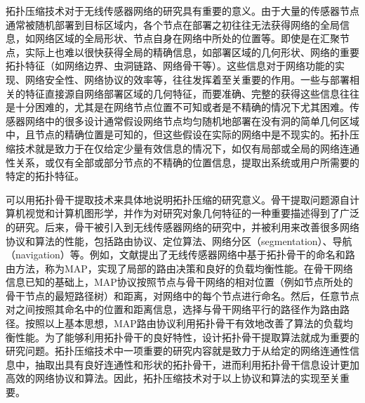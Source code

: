 拓扑压缩技术对于无线传感器网络的研究具有重要的意义。由于大量的传感器节点通常被随机部署到目标区域内，各个节点在部署之初往往无法获得网络的全局信息，如网络区域的全局形状、节点自身在网络中所处的位置等。即使是在汇聚节点，实际上也难以很快获得全局的精确信息，如部署区域的几何形状、网络的重要拓扑特征（如网络边界、虫洞链路、网络骨干等）。这些信息对于网络功能的实现、网络安全性、网络协议的效率等，往往发挥着至关重要的作用。一些与部署相关的特征直接源自网络部署区域的几何特征，而要准确、完整的获得这些信息往往是十分困难的，尤其是在网络节点位置不可知或者是不精确的情况下尤其困难。传感器网络中的很多设计通常假设网络节点均匀随机地部署在没有洞的简单几何区域中，且节点的精确位置是可知的，但这些假设在实际的网络中是不现实的。拓扑压缩技术就是致力于在仅给定少量有效信息的情况下，如仅有局部或全局的网络连通性关系，或仅有全部或部分节点的不精确的位置信息，提取出系统或用户所需要的特定的拓扑特征。

可以用拓扑骨干提取技术来具体地说明拓扑压缩的研究意义。骨干提取问题源自计算机视觉和计算机图形学，并作为对研究对象几何特征的一种重要描述得到了广泛的研究。后来，骨干被引入到无线传感器网络的研究中，并被利用来改善很多网络协议和算法的性能，包括路由协议、定位算法、网络分区（segmentation）、导航（navigation）等。例如，文献提出了无线传感器网络中基于拓扑骨干的命名和路由方法，称为MAP，实现了局部的路由决策和良好的负载均衡性能。在骨干网络信息已知的基础上，MAP协议按照节点与骨干网络的相对位置（例如节点所处的骨干节点的最短路径树）和距离，对网络中的每个节点进行命名。然后，任意节点对之间按照其命名中的位置和距离信息，选择与骨干网络平行的路径作为路由路径。按照以上基本思想，MAP路由协议利用拓扑骨干有效地改善了算法的负载均衡性能。为了能够利用拓扑骨干的良好特性，设计拓扑骨干提取算法就成为重要的研究问题。拓扑压缩技术中一项重要的研究内容就是致力于从给定的网络连通性信息中，抽取出具有良好连通性和形状的拓扑骨干，进而利用拓扑骨干信息设计更加高效的网络协议和算法。因此，拓扑压缩技术对于以上协议和算法的实现至关重要。

